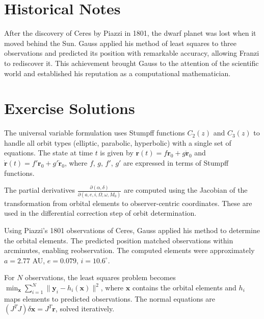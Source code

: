 \section{Historical Notes}

After the discovery of Ceres by Piazzi in 1801, the dwarf planet was lost when it moved behind the Sun. Gauss applied his method of least squares to three observations and predicted its position with remarkable accuracy, allowing Franzi to rediscover it. This achievement brought Gauss to the attention of the scientific world and established his reputation as a computational mathematician.

\section{Exercise Solutions}

\begin{solution}
The universal variable formulation uses Stumpff functions $C_2(z)$ and $C_3(z)$ to handle all orbit types (elliptic, parabolic, hyperbolic) with a single set of equations. The state at time $t$ is given by $\mathbf{r}(t) = f\mathbf{r}_0 + g\dot{\mathbf{r}}_0$ and $\dot{\mathbf{r}}(t) = f'\mathbf{r}_0 + g'\dot{\mathbf{r}}_0$, where $f$, $g$, $f'$, $g'$ are expressed in terms of Stumpff functions.
\end{solution}

\begin{solution}
The partial derivatives $\frac{\partial(\alpha, \delta)}{\partial(a, e, i, \Omega, \omega, M_0)}$ are computed using the Jacobian of the transformation from orbital elements to observer-centric coordinates. These are used in the differential correction step of orbit determination.
\end{solution}

\begin{solution}
Using Piazzi's 1801 observations of Ceres, Gauss applied his method to determine the orbital elements. The predicted position matched observations within arcminutes, enabling reobservation. The computed elements were approximately $a = 2.77$ AU, $e = 0.079$, $i = 10.6^\circ$.
\end{solution}

\begin{solution}
For $N$ observations, the least squares problem becomes $\min_{\mathbf{x}} \sum_{i=1}^N \| \mathbf{y}_i - h_i(\mathbf{x}) \|^2$, where $\mathbf{x}$ contains the orbital elements and $h_i$ maps elements to predicted observations. The normal equations are $(J^T J) \delta\mathbf{x} = J^T \mathbf{r}$, solved iteratively.
\end{solution}

